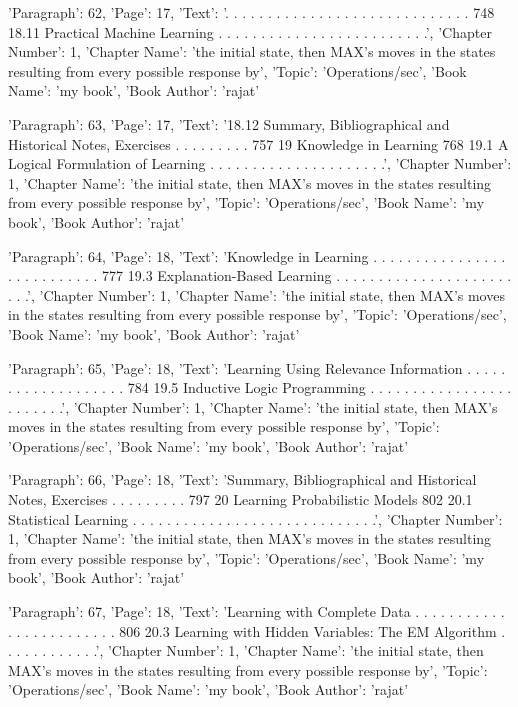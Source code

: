{'Paragraph': 62, 'Page': 17, 'Text': '. . . . . . . . . . . . . . . . . . . . . . . . . . . . . 748 18.11 Practical Machine Learning . . . . . . . . . . . . . . . . . . . . . . . . .', 'Chapter Number': 1, 'Chapter Name': 'the initial state, then MAX’s moves in the states resulting from every possible response by', 'Topic': 'Operations/sec', 'Book Name': 'my book', 'Book Author': 'rajat'}

{'Paragraph': 63, 'Page': 17, 'Text': '18.12 Summary, Bibliographical and Historical Notes, Exercises . . . . . . . . . 757 19 Knowledge in Learning 768 19.1 A Logical Formulation of Learning . . . . . . . . . . . . . . . . . . . . .', 'Chapter Number': 1, 'Chapter Name': 'the initial state, then MAX’s moves in the states resulting from every possible response by', 'Topic': 'Operations/sec', 'Book Name': 'my book', 'Book Author': 'rajat'}

{'Paragraph': 64, 'Page': 18, 'Text': 'Knowledge in Learning . . . . . . . . . . . . . . . . . . . . . . . . . . . 777 19.3 Explanation-Based Learning . . . . . . . . . . . . . . . . . . . . . . . .', 'Chapter Number': 1, 'Chapter Name': 'the initial state, then MAX’s moves in the states resulting from every possible response by', 'Topic': 'Operations/sec', 'Book Name': 'my book', 'Book Author': 'rajat'}

{'Paragraph': 65, 'Page': 18, 'Text': 'Learning Using Relevance Information . . . . . . . . . . . . . . . . . . . 784 19.5 Inductive Logic Programming . . . . . . . . . . . . . . . . . . . . . . . .', 'Chapter Number': 1, 'Chapter Name': 'the initial state, then MAX’s moves in the states resulting from every possible response by', 'Topic': 'Operations/sec', 'Book Name': 'my book', 'Book Author': 'rajat'}

{'Paragraph': 66, 'Page': 18, 'Text': 'Summary, Bibliographical and Historical Notes, Exercises . . . . . . . . . 797 20 Learning Probabilistic Models 802 20.1 Statistical Learning . . . . . . . . . . . . . . . . . . . . . . . . . . . . .', 'Chapter Number': 1, 'Chapter Name': 'the initial state, then MAX’s moves in the states resulting from every possible response by', 'Topic': 'Operations/sec', 'Book Name': 'my book', 'Book Author': 'rajat'}

{'Paragraph': 67, 'Page': 18, 'Text': 'Learning with Complete Data . . . . . . . . . . . . . . . . . . . . . . . . 806 20.3 Learning with Hidden Variables: The EM Algorithm . . . . . . . . . . . .', 'Chapter Number': 1, 'Chapter Name': 'the initial state, then MAX’s moves in the states resulting from every possible response by', 'Topic': 'Operations/sec', 'Book Name': 'my book', 'Book Author': 'rajat'}

